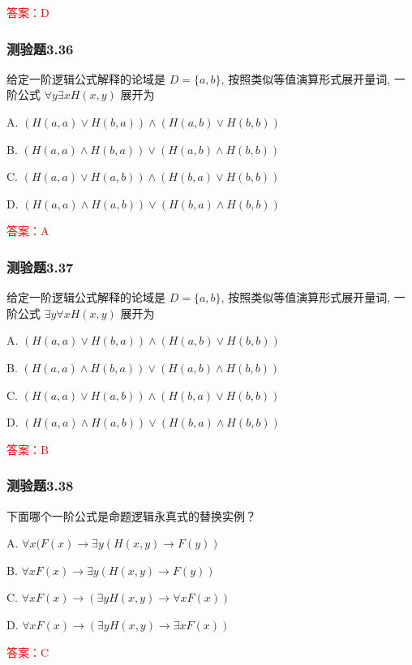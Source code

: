 \documentclass[UTF8, heading=true]{ctexart}
\begin{document}
\textcolor{red}{答案：D}


\subsubsection{测验题3.36}

给定一阶逻辑公式解释的论域是 $D=\{a, b\}$, 按照类似等值演算形式展开量词, 一阶公式 $\forall y \exists x H(x, y)$ 展开为 $\qquad$

A. $(H(a, a) \vee H(b, a)) \wedge(H(a, b) \vee H(b, b))$

B. $(H(a, a) \wedge H(b, a)) \vee(H(a, b) \wedge H(b, b))$

C. $(H(a, a) \vee H(a, b)) \wedge(H(b, a) \vee H(b, b))$

D. $(H(a, a) \wedge H(a, b)) \vee(H(b, a) \wedge H(b, b))$

\textcolor{red}{答案：A}

\subsubsection{测验题3.37}

给定一阶逻辑公式解释的论域是 $D=\{a, b\}$, 按照类似等值演算形式展开量词, 一阶公式 $\exists y \forall x H(x, y)$ 展开为 $\qquad$

A. $(H(a, a) \vee H(b, a)) \wedge(H(a, b) \vee H(b, b))$

B. $(H(a, a) \wedge H(b, a)) \vee(H(a, b) \wedge H(b, b))$

C. $(H(a, a) \vee H(a, b)) \wedge(H(b, a) \vee H(b, b))$

D. $(H(a, a) \wedge H(a, b)) \vee(H(b, a) \wedge H(b, b))$

\textcolor{red}{答案：B}


\subsubsection{测验题3.38}

下面哪个一阶公式是命题逻辑永真式的替换实例？

A. $\forall x(F(x) \rightarrow \exists y(H(x, y) \rightarrow F(y))$

B. $\forall x F(x) \rightarrow \exists y(H(x, y) \rightarrow F(y))$

C. $\forall x F(x) \rightarrow(\exists y H(x, y) \rightarrow \forall x F(x))$

D. $\forall x F(x) \rightarrow(\exists y H(x, y) \rightarrow \exists x F(x))$

\textcolor{red}{答案：C}
\end{document}
